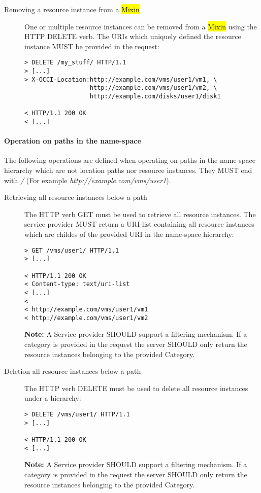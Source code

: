\documentclass[10pt,a4paper]{article}
\begin{document}
\begin{description}
\item[Removing a resource instance from a \hl{Mixin}] One or multiple
  resource instances can be removed from a \hl{Mixin} using the HTTP
  DELETE verb. The URIs which uniquely defined the resource instance
  MUST be provided in the request:
\begin{verbatim}
> DELETE /my_stuff/ HTTP/1.1
> [...]
> X-OCCI-Location:http://example.com/vms/user1/vm1, \
                  http://example.com/vms/user1/vm2, \
                  http://example.com/disks/user1/disk1

< HTTP/1.1 200 OK
< [...]
\end{verbatim}
\end{description}

\paragraph{Operation on paths in the name-space}
The following operations are defined when operating on paths in the
name-space hierarchy which are not location paths nor resource
instances. They MUST end with \emph{/} (For example
\emph{http://example.com/vms/user1}).

\begin{description}
\item[Retrieving all resource instances below a path] The HTTP verb
  GET must be used to retrieve all resource instances. The service
  provider MUST return a URI-list containing all resource instances
  which are childes of the provided URI in the name-space hierarchy:
\begin{verbatim}
> GET /vms/user1/ HTTP/1.1
> [...]
 
< HTTP/1.1 200 OK
< Content-type: text/uri-list
< [...]
< 
< http://example.com/vms/user1/vm1
< http://example.com/vms/user1/vm2
\end{verbatim}
\textbf{Note:} A Service provider SHOULD support a filtering
mechanism. If a category is provided in the request the server SHOULD
only return the resource instances belonging to the provided
Category.

\item[Deletion all resource instances below a path] The HTTP verb
  DELETE must be used to delete all resource instances under a
  hierarchy:
\begin{verbatim}
> DELETE /vms/user1/ HTTP/1.1
> [...]
 
< HTTP/1.1 200 OK
< [...]
\end{verbatim}
\textbf{Note:} A Service provider SHOULD support a filtering
mechanism. If a category is provided in the request the server SHOULD
only return the resource instances belonging to the provided
Category.
\end{description}
\end{document}
